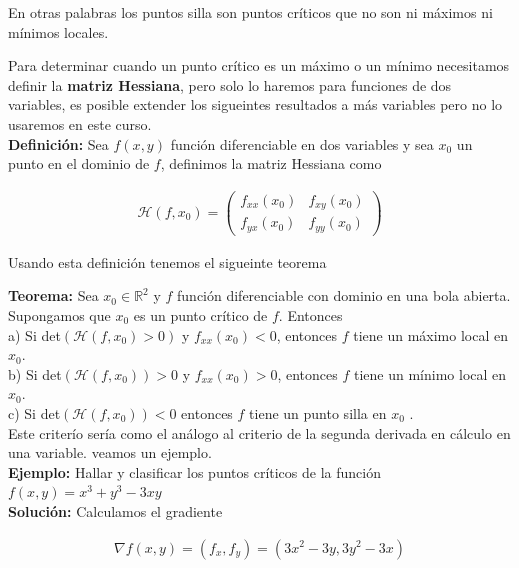 \documentclass{article}
\theoremstyle{definition}
\begin{document}
En otras palabras los puntos silla son puntos críticos que no son ni máximos ni mínimos locales. \\

\newpage

Para determinar cuando un punto crítico es un máximo o un mínimo necesitamos definir la \textbf{matriz Hessiana}, pero solo lo haremos para funciones de dos variables, es posible extender los sigueintes resultados a más variables pero no lo usaremos en este curso. \\

\textbf{Definición: } Sea $f(x,y)$ función diferenciable en dos variables y sea $x_0$ un punto en el dominio de $f$, definimos la matriz Hessiana como

\begin{align*}
    \mathcal{H}(f,x_0) = \begin{pmatrix}
        f_{xx}(x_0) & f_{xy}(x_0) \\
        f_{yx}(x_0) & f_{yy}(x_0)
    \end{pmatrix}
\end{align*}


Usando esta definición tenemos el sigueinte teorema



\textbf{Teorema: }Sea $x_0 \in \mathbb{R}^2$ y $f$ función diferenciable con dominio en una bola abierta. Supongamos que $x_0$ es un punto crítico de $f$. Entonces \\

a) Si det$(\mathcal{H}(f,x_0)>0)$ y $f_{xx}(x_0)<0$, entonces $f$ tiene un máximo local en $x_0$. \\
b) Si det$(\mathcal{H}(f,x_0))>0$ y $f_{xx}(x_0)>0$, entonces $f$ tiene un mínimo local en $x_0$. \\
c) Si det$(\mathcal{H}(f,x_0))<0$ entonces $f$ tiene un punto silla en $x_0$ . \\

Este criterío sería como el análogo al criterio de la segunda derivada en cálculo en una variable. veamos un ejemplo.\\

\textbf{Ejemplo:} Hallar y clasificar los puntos críticos de la función $f(x,y) =x^3+y^3-3xy$ \\

\textbf{Solución: } Calculamos el gradiente

\begin{align*}
    \nabla f (x,y) = (f_x,f_y) = (3x^2-3y,3y^2-3x)
\end{align*}
\end{document}
